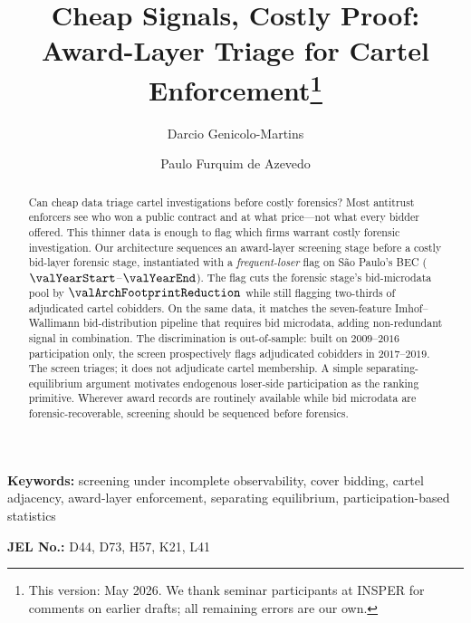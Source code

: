 \begin{frontmatter}

\title{Cheap Signals, Costly Proof: Award-Layer Triage for Cartel Enforcement\texorpdfstring{\footnote{This version: May 2026. We thank seminar participants at INSPER for comments on earlier drafts; all remaining errors are our own.}}{}}

\author[insper]{Darcio Genicolo-Martins}
\author[insper]{Paulo Furquim de Azevedo}

\begin{abstract}
Can cheap data triage cartel investigations before costly
forensics? Most antitrust enforcers see who won a public
contract and at what price---not what every bidder offered.
This thinner data is enough to flag which firms warrant costly
forensic investigation. Our architecture sequences an
award-layer screening stage before a costly bid-layer forensic
stage, instantiated with a \emph{frequent-loser} flag on
São Paulo's BEC ($\valYearStart$--$\valYearEnd$). The flag
cuts the forensic stage's bid-microdata pool by
$\valArchFootprintReduction$ while still flagging two-thirds
of adjudicated cartel cobidders. On the same data, it matches
the seven-feature Imhof--Wallimann bid-distribution pipeline
that requires bid microdata, adding non-redundant signal in
combination. The discrimination is out-of-sample: built on
$2009$--$2016$ participation only, the screen prospectively
flags adjudicated cobidders in $2017$--$2019$. The screen
triages; it does not adjudicate cartel membership. A simple
separating-equilibrium argument
motivates endogenous loser-side participation as the ranking
primitive. Wherever award records are routinely available while
bid microdata are forensic-recoverable, screening should be
sequenced before forensics.
\end{abstract}

\end{frontmatter}

\noindent\textbf{Keywords:} screening under incomplete observability, cover bidding, cartel adjacency, award-layer enforcement, separating equilibrium, participation-based statistics

\noindent\textbf{JEL No.:} D44, D73, H57, K21, L41

\bigskip
